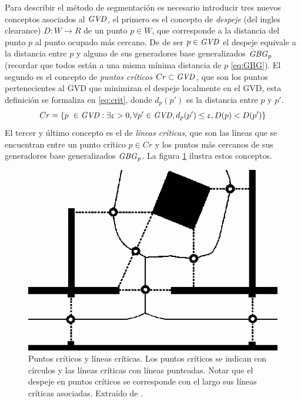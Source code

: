 Para describir el método de segmentación es necesario introducir tres nuevos conceptos asociados al $\mathit{GVD}$, el primero es el concepto de \emph{despeje} (del ingles clearance) $D : W \rightarrow R$ de un punto $p \in W$, que corresponde a la distancia del punto $p$ al punto ocupado más cercano. De de ser $p \in \mathit{GVD}$ el despeje equivale a la distancia entre $p$ y alguno de sus generadores base generalizados $\mathit{GBG}_p$ (recordar que todos están a una misma mínima distancia de $p$ \eqref{eq:GBG}). El segundo es el concepto de \emph{puntos críticos} $Cr \subset \mathit{GVD}$, que son los puntos pertenecientes al GVD que minimizan el despeje localmente en el GVD, esta definición se formaliza en \eqref{eq:crit}, donde $d_p(p')$ es la distancia entre $p$ y $p'$. 
\begin{equation}
  Cr = \{p\ \in \mathit{GVD} : \exists \upvarepsilon > 0, \forall p' \in \mathit{GVD}, d_p(p') \leq \upvarepsilon, D(p) < D(p') \} \label{eq:crit}
\end{equation}
El tercer y último concepto es el de \emph{líneas críticas}, que son las líneas
que se encuentran entre un punto crítico $p \in Cr$ y los puntos más cercanos de
sus generadores base generalizados $\mathit{GBG}_p$. La figura \ref{fig:crits}
ilustra estos conceptos.

\begin{figure}[H]
  \center
  \includegraphics[width=0.75\linewidth]{imagenes/CritsSharpMono.png}
  \caption[Puntos críticos y lineas críticas.]{Puntos críticos y líneas críticas. Los puntos críticos se indican con círculos y las líneas críticas con líneas punteadas. Notar que el despeje en puntos críticos se corresponde con el largo sus líneas críticas asociadas. Extraído de \cite{Thrun1998}.}\label{fig:crits}
\end{figure} 



